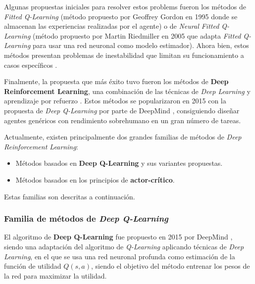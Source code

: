 Algunas propuestas iniciales para resolver estos problems fueron los métodos de \textit{Fitted Q-Learning} (método propuesto por Geoffrey Gordon en 1995 \cite{NIPS1995_fd06b8ea} donde se almacenan las experiencias realizadas por el agente) o de \textit{Neural Fitted Q-Learning} (método propuesto por Martin Riedmiller en 2005 \cite{10.1007/11564096_32} que adapta \textit{Fitted Q-Learning} para usar una red neuronal como modelo estimador). Ahora bien, estos métodos presentan problemas de inestabilidad que limitan su funcionamiento a casos específicos \cite{DBLP:journals/corr/abs-1811-12560}.

Finalmente, la propuesta que más éxito tuvo fueron los métodos de \textbf{Deep Reinforcement Learning}, una combinación de las técnicas de \textit{Deep Learning} y aprendizaje por refuerzo \cite{DBLP:journals/corr/abs-1811-12560}. Estos métodos se popularizaron en 2015 con la propuesta de \textit{Deep Q-Learning} por parte de DeepMind \cite{Mnih2015HumanlevelCT}, consiguiendo diseñar agentes genéricos con rendimiento sobrehumano en un gran número de tareas.

Actualmente, existen principalmente dos grandes familias de métodos de \textit{Deep Reinforcement Learning}:
\begin{itemize}
	\item Métodos basados en \textbf{Deep Q-Learning} y sus variantes propuestas.
	\item Métodos basados en los principios de \textbf{actor-crítico}.
\end{itemize}

Estas familias son descritas a continuación.

\subsubsection{Familia de métodos de \textit{Deep Q-Learning}}

El algoritmo de \textbf{Deep Q-Learning} fue propuesto en 2015 por DeepMind \cite{Mnih2015HumanlevelCT}, siendo una adaptación del algoritmo de \textit{Q-Learning} aplicando técnicas de \textit{Deep Learning}, en el que se usa una red neuronal profunda como estimación de la función de utilidad $Q(s,a)$, siendo el objetivo del método entrenar los pesos de la red para maximizar la utilidad.

